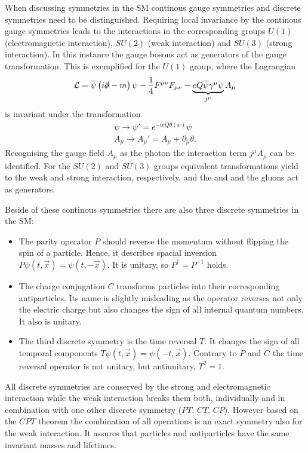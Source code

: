 When discussing symmetries in the \ac{SM} continous gauge symmetries and discrete symmetries need to be distinguished.
Requiring local invariance by the continous gauge symmetries leads to the interactions in the corresponding groups $U(1)$ (electromagnetic interaction), $SU(2)$ (weak interaction) and $SU(3)$ (strong interaction).
In this instance the gauge bosons act as generators of the gauge transformation.
This is exemplified for the $U(1)$ group, where the Lagrangian
\begin{equation}
\mathcal{L}=\overline{\psi}\left(i\slashed{\partial} - m\right)\psi
- \frac{1}{4}F^{\mu\nu}F_{\mu\nu} - \underbrace{eQ\overline{\psi}\gamma^{\mu}\psi}_{j^{\mu}}A_{\mu}
\end{equation}
is invariant under the transformation
\begin{align}
\psi\rightarrow\psi'=e^{-ieQ\theta\left(x\right)}\psi\\
A_\mu\rightarrow A_\mu'=A_\mu+\partial_\mu\theta.
\end{align}
Recognising the gauge field $A_\mu$ as the photon the interaction term $j^\mu A_\mu$ can be identified.
For the $SU(2)$ and $SU(3)$ groups equivalent transformations yield to the weak and strong interaction, respectively, and the \Wpm and \Z and the gluons act as generators.

Beside of these continous symmetries there are also three discrete symmetries in the \ac{SM}:
\begin{itemize}
	\item The parity operator $P$ should reverse the momentum without flipping the spin of a particle.
		Hence, it describes spacial inversion $P\psi\left(t,\vec{x}\right) = \psi\left(t,-\vec{x}\right)$.
		It is unitary, so $P^{\dagger}=P^{-1}$ holds.
	\item The charge conjugation $C$ transforms particles into their corresponding antiparticles.
		Its name is slightly misleading as the operator reverses not only the electric charge but also changes the sign of all internal quantum numbers.
		It also is unitary.
	\item The third discrete symmetry is the time reversal $T$.
		It changes the sign of all temporal components $T\psi\left(t,\vec{x}\right) = \psi\left(-t,\vec{x}\right)$.
		Contrary to $P$ and $C$ the time reversal operator is not unitary, but antiunitary, \ie $T^2=1$.
\end{itemize}
All discrete symmetries are conserved by the strong and electromagnetic interaction while the weak interaction breaks them both,
individually and in combination with one other discrete symmetry ($PT$, $CT$, $CP$).
However based on the $CPT$ theorem the combination of all operations is an exact symmetry also for the weak interaction.
It assures that particles and antiparticles have the same invariant masses and lifetimes.

